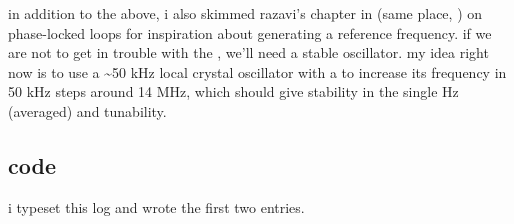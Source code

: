 in addition to the above, i also skimmed razavi's chapter in
\autocite{rf-microelectronics} (same place, ) on
phase-locked loops for inspiration about generating a reference frequency. if
we are not to get in trouble with the \fcc, we'll need a stable oscillator. my
idea right now is to use a \textasciitilde 50 kHz local crystal oscillator with
a \pll to increase its frequency in 50 kHz steps around 14 MHz, which should
give stability in the single Hz (averaged) and tunability.

\subsection*{code}
i typeset this log and wrote the first two entries.
